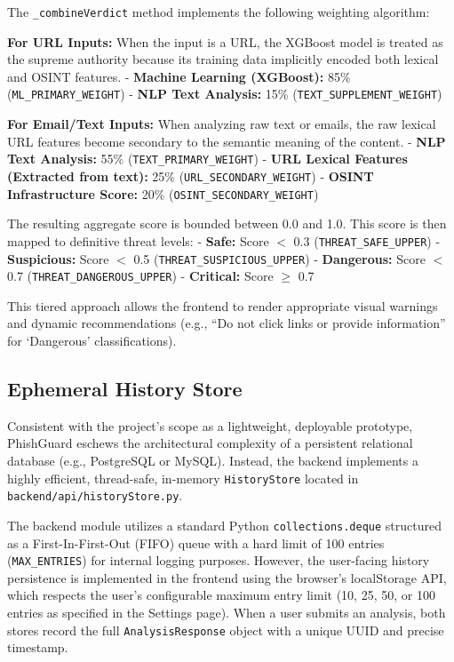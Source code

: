 The \texttt{\_combineVerdict} method implements the following weighting
algorithm:

\textbf{For URL Inputs:} When the input is a URL, the XGBoost model is
treated as the supreme authority because its training data implicitly
encoded both lexical and OSINT features. - \textbf{Machine Learning
(XGBoost):} 85\% (\texttt{ML\_PRIMARY\_WEIGHT}) - \textbf{NLP Text
Analysis:} 15\% (\texttt{TEXT\_SUPPLEMENT\_WEIGHT})

\textbf{For Email/Text Inputs:} When analyzing raw text or emails, the
raw lexical URL features become secondary to the semantic meaning of the
content. - \textbf{NLP Text Analysis:} 55\%
(\texttt{TEXT\_PRIMARY\_WEIGHT}) - \textbf{URL Lexical Features
(Extracted from text):} 25\% (\texttt{URL\_SECONDARY\_WEIGHT}) -
\textbf{OSINT Infrastructure Score:} 20\%
(\texttt{OSINT\_SECONDARY\_WEIGHT})

The resulting aggregate score is bounded between 0.0 and 1.0. This score
is then mapped to definitive threat levels: - \textbf{Safe:} Score
$<${} 0.3 (\texttt{THREAT\_SAFE\_UPPER}) - \textbf{Suspicious:}
Score $<${} 0.5 (\texttt{THREAT\_SUSPICIOUS\_UPPER}) -
\textbf{Dangerous:} Score $<${} 0.7
(\texttt{THREAT\_DANGEROUS\_UPPER}) - \textbf{Critical:} Score \(\ge\)
0.7

This tiered approach allows the frontend to render appropriate visual
warnings and dynamic recommendations (e.g., ``Do not click links or
provide information'' for `Dangerous' classifications).

\subsection{Ephemeral History
Store}\label{ephemeral-history-store}

Consistent with the project's scope as a lightweight, deployable
prototype, PhishGuard eschews the architectural complexity of a
persistent relational database (e.g., PostgreSQL or MySQL). Instead, the
backend implements a highly efficient, thread-safe, in-memory
\texttt{HistoryStore} located in \texttt{backend/api/historyStore.py}.

The backend module utilizes a standard Python \texttt{collections.deque}
structured as a First-In-First-Out (FIFO) queue with a hard limit of 100
entries (\texttt{MAX\_ENTRIES}) for internal logging purposes. However, the
user-facing history persistence is implemented in the frontend using the
browser's localStorage API, which respects the user's configurable maximum
entry limit (10, 25, 50, or 100 entries as specified in the Settings page).
When a user submits an analysis, both stores record the full
\texttt{AnalysisResponse} object with a unique UUID and precise timestamp.

